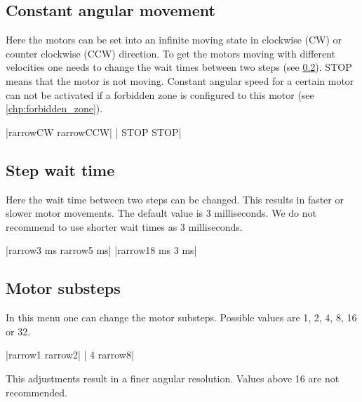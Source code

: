 \subsection{Constant angular movement}
Here the motors can be set into an infinite moving state in clockwise
(CW) or counter clockwise (CCW) direction. To get the motors moving
with different velocities one needs to change the wait times between
two steps (see \ref{menu_step_wait_time}).
STOP means that the motor is not moving. Constant angular speed for a
certain motor can not be activated if a forbidden zone is configured to
this motor (see \ref{chp:forbidden_zone}).
\begin{center}
  |{rarrow}CW     {rarrow}CCW|
             | STOP    STOP|
\end{center}


\subsection{Step wait time}
\label{menu_step_wait_time}
Here the wait time between two steps can be changed. This results in
faster or slower motor movements. The default value is 3 milliseconds.
We do not recommend to use shorter wait times as 3 milliseconds.
\begin{center}
  |{rarrow}3 ms   {rarrow}5 ms|
             |{rarrow}18 ms   3 ms|
\end{center}


\subsection{Motor substeps}
In this menu one can change the motor substeps. Possible values are 1,
2, 4, 8, 16 or 32.
\begin{center}
  |{rarrow}1      {rarrow}2|
             | 4      {rarrow}8|
\end{center}
This adjustments result in a finer angular resolution. Values above
16 are not recommended.


